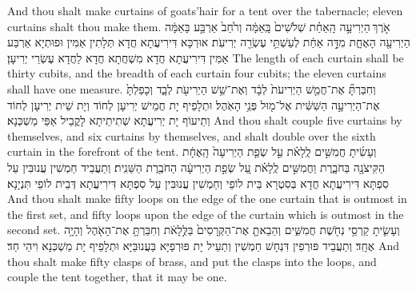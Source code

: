 {{And thou shalt make curtains of goats’hair for a tent over the tabernacle; eleven curtains shalt thou make them.}{}
{אֹ֣רֶךְ \legarmeh  הַיְרִיעָ֣ה הָֽאַחַ֗ת שְׁלֹשִׁים֙ בָּֽאַמָּ֔ה וְרֹ֙חַב֙ אַרְבַּ֣ע בָּאַמָּ֔ה הַיְרִיעָ֖ה הָאֶחָ֑ת מִדָּ֣ה אַחַ֔ת לְעַשְׁתֵּ֥י עֶשְׂרֵ֖ה יְרִיעֹֽת׃
}
{אוּרְכָּא דִּירִיעֲתָא חֲדָא תְּלָתִין אַמִּין וּפוּתְיָא אַרְבַּע אַמִּין דִּירִיעֲתָא חֲדָא מִשְׁחֲתָא חֲדָא לַחֲדָא עֶשְׂרֵי יְרִיעָן׃}
{The length of each curtain shall be thirty cubits, and the breadth of each curtain four cubits; the eleven curtains shall have one measure.}{}
{וְחִבַּרְתָּ֞ אֶת־חֲמֵ֤שׁ הַיְרִיעֹת֙ לְבָ֔ד וְאֶת־שֵׁ֥שׁ הַיְרִיעֹ֖ת לְבָ֑ד וְכָפַלְתָּ֙ אֶת־הַיְרִיעָ֣ה הַשִּׁשִּׁ֔ית אֶל־מ֖וּל פְּנֵ֥י הָאֹֽהֶל׃
}
{וּתְלָפֵיף יָת חֲמֵישׁ יְרִיעָן לְחוֹד וְיָת שֵׁית יְרִיעָן לְחוֹד וְתֵיעוֹף יָת יְרִיעֲתָא שְׁתִיתֵיתָא לָקֳבֵיל אַפֵּי מַשְׁכְּנָא׃}
{And thou shalt couple five curtains by themselves, and six curtains by themselves, and shalt double over the sixth curtain in the forefront of the tent.}{}
{וְעָשִׂ֜יתָ חֲמִשִּׁ֣ים לֻֽלָאֹ֗ת עַ֣ל שְׂפַ֤ת הַיְרִיעָה֙ הָֽאֶחָ֔ת הַקִּיצֹנָ֖ה בַּחֹבָ֑רֶת וַחֲמִשִּׁ֣ים לֻֽלָאֹ֗ת עַ֚ל שְׂפַ֣ת הַיְרִיעָ֔ה הַחֹבֶ֖רֶת הַשֵּׁנִֽית׃}
{וְתַעֲבֵיד חַמְשִׁין עֲנוּבִּין עַל סִפְתָּא דִּירִיעֲתָא חֲדָא בְּסִטְרָא בֵּית לוֹפֵי וְחַמְשִׁין עֲנוּבִּין עַל סִפְתָּא דִּירִיעֲתָא דְּבֵית לוֹפֵי תִּנְיָנָא׃}
{And thou shalt make fifty loops on the edge of the one curtain that is outmost in the first set, and fifty loops upon the edge of the curtain which is outmost in the second set.}{}
{וְעָשִׂ֛יתָ קַרְסֵ֥י נְחֹ֖שֶׁת חֲמִשִּׁ֑ים וְהֵבֵאתָ֤ אֶת־הַקְּרָסִים֙ בַּלֻּ֣לָאֹ֔ת וְחִבַּרְתָּ֥ אֶת־הָאֹ֖הֶל וְהָיָ֥ה אֶחָֽד׃}
{וְתַעֲבֵיד פּוּרְפִין דִּנְחָשׁ חַמְשִׁין וְתַעֵיל יָת פּוּרְפַיָּא בַּעֲנוּבַּיָּא וּתְלָפֵיף יָת מַשְׁכְּנָא וִיהֵי חַד׃}
{And thou shalt make fifty clasps of brass, and put the clasps into the loops, and couple the tent together, that it may be one.}{}
}
